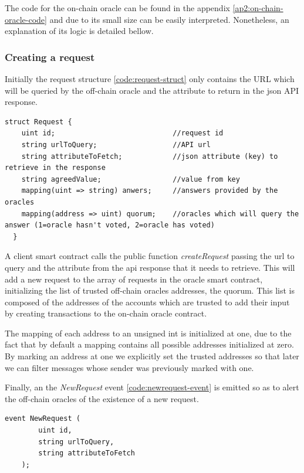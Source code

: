 The code for the on-chain oracle can be found in the appendix \ref{ap2:on-chain-oracle-code} and due to its small size can be easily interpreted. Nonetheless, an explanation of its logic is detailed bellow.

\subsubsection{Creating a request}

Initially the request structure \ref{code:request-struct} only contains the URL which will be queried by the off-chain oracle and the attribute to return in the json API response.

\begin{lstlisting}[language=Solidity, label=code:request-struct]
  struct Request {
    uint id;                            //request id
    string urlToQuery;                  //API url
    string attributeToFetch;            //json attribute (key) to retrieve in the response
    string agreedValue;                 //value from key
    mapping(uint => string) anwers;     //answers provided by the oracles
    mapping(address => uint) quorum;    //oracles which will query the answer (1=oracle hasn't voted, 2=oracle has voted)
  }
\end{lstlisting}

A client smart contract calls the public function \textit{createRequest}
passing the url to query and the attribute from the api response that it needs to retrieve. This will add a new request to the array of requests in the oracle smart contract, initializing the list of trusted off-chain oracles addresses, the quorum. This list is composed of the addresses of the accounts which are trusted to add their input by creating transactions to the on-chain oracle contract.

The mapping of each address to an unsigned int is initialized at one, due to the fact that by default a mapping contains all possible addresses initialized at zero. By marking an address at one we explicitly set the trusted addresses so that later we can filter messages whose sender was previously marked with one.

Finally, an the \textit{NewRequest} event \ref{code:newrequest-event} is emitted so as to alert the off-chain oracles of the existence of a new request.

\begin{lstlisting}[language=Solidity, label=code:newrequest-event]
    event NewRequest (
        uint id,
        string urlToQuery,
        string attributeToFetch
    );
\end{lstlisting}

